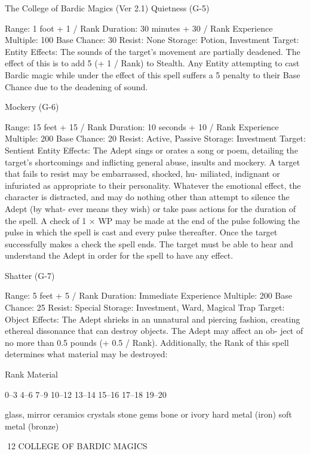 \begin{Chapter}{The College of Bardic Magics (Ver 2.1)}
Quietness (G-5) 

Range: 1 foot + 1 / Rank 
Duration: 30 minutes + 30 / Rank 
Experience Multiple: 100 
Base Chance: 30%
Resist: None 
Storage: Potion, Investment 
Target: Entity 
Effects:  The  sounds  of  the  target’s  movement  are 
partially deadened. The effect of this is to add 5%
(+  1  /  Rank)  to  Stealth.  Any  Entity  attempting  to 
cast  Bardic  magic  while  under  the  effect  of  this 
spell  suffers  a  5  penalty  to  their  Base  Chance  due 
to the deadening of sound. 

Mockery (G-6) 

Range: 15 feet + 15 / Rank 
Duration: 10 seconds + 10 / Rank 
Experience Multiple: 200 
Base Chance: 20%
Resist: Active, Passive 
Storage: Investment 
Target: Sentient Entity 
Effects: The Adept sings or orates a song or poem, 
detailing  the  target’s  shortcomings  and  inflicting 
general  abuse,  insults  and  mockery.  A  target  that 
fails  to  resist  may  be  embarrassed,  shocked,  hu-
miliated,  indignant  or  infuriated  as  appropriate  to 
their  personality.  Whatever  the  emotional  effect, 
the  character  is  distracted,  and  may  do  nothing 
other  than  attempt  to  silence  the  Adept  (by  what-
ever means they  wish) or take pass actions for the 
duration  of  the  spell.  A  check  of  1  ×  WP  may  be 
made at the end of the pulse following the pulse in 
which  the  spell  is  cast  and  every  pulse  thereafter. 
Once  the  target  successfully  makes  a  check  the 
spell  ends.  The  target  must  be  able  to  hear  and 
understand the Adept in order for the spell to have 
any effect. 

Shatter (G-7) 

Range: 5 feet + 5 / Rank 
Duration: Immediate 
Experience Multiple: 200 
Base Chance: 25%
Resist: Special 
Storage: Investment, Ward, Magical Trap 
Target: Object 
Effects:  The  Adept  shrieks  in  an  unnatural  and 
piercing  fashion,  creating  ethereal  dissonance  that 
can  destroy  objects.  The  Adept  may  affect  an  ob-
ject  of  no  more  than  0.5  pounds  (+  0.5  /  Rank). 
Additionally,  the  Rank  of  this  spell  determines 
what material may be destroyed: 

Rank  Material 

0–3 
4–6 
7–9 
10–12 
13–14 
15–16 
17–18 
19–20 

glass, mirror 
ceramics 
crystals 
stone 
gems 
bone or ivory 
hard metal (iron) 
soft metal (bronze) 

12 COLLEGE OF BARDIC MAGICS 


\end{Chapter}

